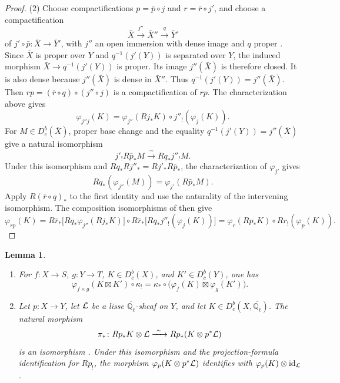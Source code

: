 \documentclass[12pt,reqno]{amsart}
\theoremstyle{definition}
\theoremstyle{plain}
\newtheorem{lem}[para]{Lemma}
\theoremstyle{definition}
\theoremstyle{remark}
\newcommand{\bbQ}{\mathbb{Q}}  \newcommand{\bbR}{\mathbb{R}}
\newcommand{\ol}[1]{\overline{#1}}
\newcommand{\Ql}{\bbQ_{\ell}}
\newcommand{\Db}{D^b_c}
\begin{document}
\begin{proof}
(2)  Choose compactifications \(p=\bar p\circ j\) and \(r=\bar r\circ j'\), and choose a
compactification
\[
        \bar X\xrightarrow{\ j''\ }\bar X''\xrightarrow{\ q\ }\bar Y'
\]
of \(j'\circ\bar p\colon\bar X\to\bar Y'\), with \(j''\) an open immersion with dense image and \(q\) proper
\cite[Tag~0ATU]{stacks-project}.  Since \(\bar X\) is proper over
\(Y\) and \(q^{-1}(j'(Y))\) is separated over \(Y\), the induced morphism
\(\bar X\to q^{-1}(j'(Y))\) is proper.  Its image \(j''(\bar X)\) is therefore closed.  It is also dense
because \(j''(\bar X)\) is dense in \(\bar X''\).  Thus \(q^{-1}(j'(Y))=j''(\bar X)\).  Then
\(rp=(\bar r\circ q)\circ(j''\circ j)\) is a compactification of \(rp\).  The characterization above gives
\[
        \varphi_{j''j}(K)=\varphi_{j''}(Rj_*K)\circ j''_!(\varphi_j(K)).
\]
For \(M\in\Db(\bar X)\), proper base change and the equality
\(q^{-1}(j'(Y))=j''(\bar X)\) give a natural isomorphism
\[
        j'_!R\bar p_*M\xrightarrow{\ \sim\ }Rq_*j''_!M.
\]
Under this isomorphism and \(Rq_*Rj''_*=Rj'_*R\bar p_*\), the characterization of \(\varphi_{j'}\) gives
\[
        Rq_*(\varphi_{j''}(M))=\varphi_{j'}(R\bar p_*M).
\]
Apply \(R(\bar r\circ q)_*\) to the first identity and use the naturality of the intervening isomorphism.  The
composition isomorphisms of \cite[Exp.~XVII, \S5.1]{SGA4} then give
\[
        \varphi_{rp}(K)
        =R\bar r_*\bigl[Rq_*\varphi_{j''}(Rj_*K)\bigr]
         \circ R\bar r_*\bigl[Rq_*j''_!(\varphi_j(K))\bigr]
        =\varphi_r(Rp_*K)\circ Rr_!(\varphi_p(K)).
\]
\end{proof}

\begin{lem}
\label{lem:forget-supports-products}
\begin{enumerate}
\item For \(f:X\to S\), \(g:Y\to T\), \(K\in\Db(X)\), and \(K'\in\Db(Y)\), one has
\[
        \varphi_{f\times g}(K\boxtimes K')\circ\kappa_!
        =\kappa_*\circ\bigl(\varphi_f(K)\boxtimes\varphi_g(K')\bigr).
\]
\item Let \(p:X\to Y\), let \(\mathcal{L}\) be a lisse \(\ol\Ql\)-sheaf on \(Y\), and let
\(K\in\Db(X,\ol\Ql)\).  The natural morphism
\[
 \pi_*\colon Rp_*K\otimes\mathcal{L}\xrightarrow{\ \sim\ }Rp_*(K\otimes p^*\mathcal{L})
\]
is an isomorphism \cite[Prop.~A.1.5(i)]{GabberLoeser1996}.  Under this isomorphism and the
projection-formula identification for \(Rp_!\), the morphism \(\varphi_p(K\otimes p^*\mathcal{L})\) identifies
with \(\varphi_p(K)\otimes\operatorname{id}_{\mathcal{L}}\).
\end{enumerate}
\end{lem}
\end{document}
